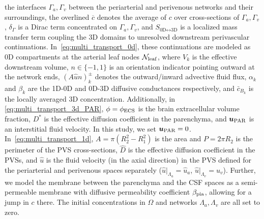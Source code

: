 \documentclass[fleqn,10pt]{wlscirep}
\begin{document}
the interfaces $\Gamma_a, \Gamma_v$ between the periarterial and
perivenous networks and their surroundings, the overlined
$\overline{c}$ denotes the average of $c$ over cross-sections of
$\Gamma_a, \Gamma_v$, $\delta_{\Gamma}$ is a Dirac term
concentrated on $\Gamma_a, \Gamma_v$, and $S_{\text{0D} \leftrightarrow \text{3D}}$ is a localized mass transfer term coupling the 3D domains to unresolved downstream perivascular continuations. 
In~\eqref{eq:multi_transport_0d}, 
these continuations are modeled as 0D compartments at the arterial leaf nodes 
$\mathcal{N}_{\rm leaf}$, where $V_k$ is the effective downstream volume, $n \in \{-1, 1\}$ is an orientation indicator pointing outward at the network ends, $(A \hat{u} n)^{\pm}_k$ denotes the outward/inward advective 
fluid flux, $\alpha_k$ and $\beta_k$ are the 
1D-0D and 0D-3D diffusive conductances respectively, and $\bar{c}_{B_k}$ is 
the locally averaged 3D concentration.
Additionally, in \eqref{eq:multi_transport_3d_PAR}, $\phi = \phi_{\rm ECS}$ is the
brain extracellular volume fraction, $D^{\ast}$ is the effective
diffusion coefficient in the parenchyma, and $\bm u_{\rm PAR}$ is an
interstitial fluid velocity. In this study, we set $\bm u_{\rm PAR} =
0$. In~\eqref{eq:multi_transport_1d}, $A = \pi (R_2^2 - R_1^2)$ is the
area and $P = 2 \pi R_2$ is the perimeter of the PVS cross-sections,
$\hat{D}$ is the effective diffusion coefficient in the PVSs, and
$\hat{u}$ is the fluid velocity (in the axial direction) in the PVS
defined for the periarterial and perivenous spaces separately
($\hat{u}|_{\Lambda_a} = \hat{u}_a$, $\hat{u}|_{\Lambda_v} =
\hat{u}_v$). Further, we model the membrane between the parenchyma and
the CSF spaces as a semi-permeable membrane with diffusive
permeability coefficient $\beta_{\rm pia}$, allowing for a jump in $c$
there. The initial concentrations in $\Omega$ and networks $\Lambda_a,
\Lambda_v$ are all set to zero.

\end{document}
